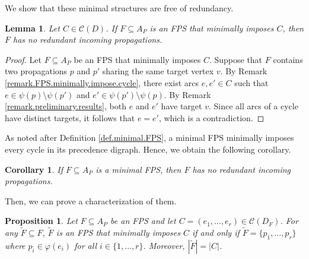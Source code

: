 \documentclass{article}
\newcommand{\CC}{{\mathscr C}}
\newtheorem{proposition}{Proposition}
\newtheorem{corollary}{Corollary}
\newtheorem{lemma}{Lemma}
\begin{document}
We show that these minimal structures are free of redundancy.

\begin{lemma}\label{lemma.minimally.impose.implies.no.redundancy}
    Let $C \in \CC(D)$.
    If $F \subseteq A_P$ is an FPS that minimally imposes $C$, then $F$ has no redundant incoming propagations.
\end{lemma}
\begin{proof}
Let $F \subseteq A_P$ be an FPS that minimally imposes $C$.
Suppose that $F$ contains two propagations $p$ and $p'$ sharing the same target vertex $v$.
By Remark \ref{remark.FPS.minimally.impose.cycle}, there exist arcs $e, e' \in C$ such that $e \in \psi(p) \setminus \psi(p')$ and $e' \in \psi(p') \setminus \psi(p)$.
By Remark \ref{remark.preliminary.results}, both $e$ and $e'$ have target $v$.
Since all arcs of a cycle have distinct targets, it follows that $e = e'$, which is a contradiction.
\end{proof}

As noted after Definition \ref{def.minimal.FPS}, a minimal FPS minimally imposes every cycle in its precedence digraph. Hence, we obtain the following corollary.

\begin{corollary}\label{corollary.minimal.implies.no.redundancy}
    If $F \subseteq A_P$ is a minimal FPS, then $F$ has no redundant incoming propagations.
\end{corollary}

Then, we can prove a characterization of them.

\begin{proposition}\label{prop.minimally.impose}
    Let $F \subseteq A_P$ be an FPS and let $C = (e_1,\dots, e_r) \in \CC(D_F)$.
    For any $\tilde F \subseteq F$, $\tilde F$ is an FPS that minimally imposes $C$ if and only if $\tilde F = \{p_1, \ldots, p_r\}$ where $p_i \in \varphi(e_i)$ for all $i \in \{1,\ldots,r\}$.
    Moreover, $|\tilde F| = |C|$.
\end{proposition}
\end{document}
